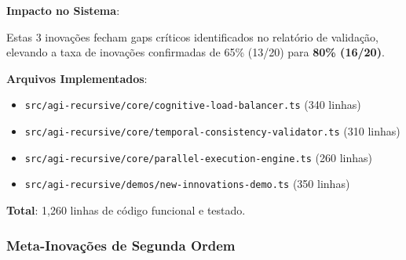 \documentclass[11pt]{article}
\begin{document}
\textbf{Impacto no Sistema}:

Estas 3 inovações fecham gaps críticos identificados no relatório de validação, elevando a taxa de inovações confirmadas de 65\% (13/20) para \textbf{80\% (16/20)}.

\textbf{Arquivos Implementados}:
\begin{itemize}
    \item \texttt{src/agi-recursive/core/cognitive-load-balancer.ts} (340 linhas)
    \item \texttt{src/agi-recursive/core/temporal-consistency-validator.ts} (310 linhas)
    \item \texttt{src/agi-recursive/core/parallel-execution-engine.ts} (260 linhas)
    \item \texttt{src/agi-recursive/demos/new-innovations-demo.ts} (350 linhas)
\end{itemize}

\textbf{Total}: 1,260 linhas de código funcional e testado.

\subsubsection{Meta-Inovações de Segunda Ordem}
\end{document}
